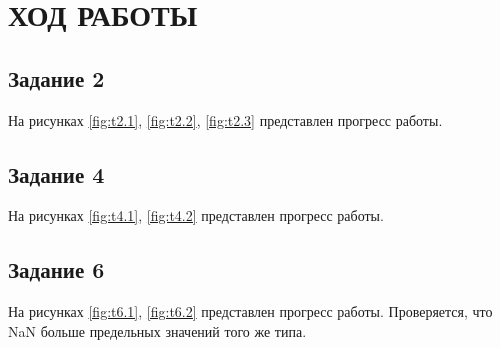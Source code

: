 


\chapter{ХОД РАБОТЫ}

\vspace{14pt}

\section{Задание 2}

На рисунках \ref{fig:t2.1}, \ref{fig:t2.2}, \ref{fig:t2.3} представлен прогресс работы.

\begin{myfigure}{2.1}
  \caption{Создание таблицы}
  \label{fig:t2.1}
\end{myfigure}

\begin{myfigure}{2.2}
  \caption{Вставка значений различной точности и масштаба}
  \label{fig:t2.2}
\end{myfigure}

\begin{myfigure}{2.3}
  \caption{Проверка результата}
  \label{fig:t2.3}
\end{myfigure}

\section{Задание 4}

На рисунках \ref{fig:t4.1}, \ref{fig:t4.2} представлен прогресс работы.

\begin{myfigure}{4.1}
  \caption{Эксперименты с точностью, часть 1}
  \label{fig:t4.1}
\end{myfigure}

\begin{myfigure}{4.2}
  \caption{Эксперименты с точностью, часть 2}
  \label{fig:t4.2}
\end{myfigure}

\section{Задание 6}

На рисунках \ref{fig:t6.1}, \ref{fig:t6.2} представлен прогресс работы. Проверяется, что NaN больше предельных значений того же типа.


